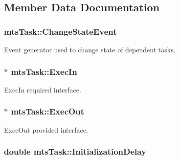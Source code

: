 \subsection{Member Data Documentation}
\hypertarget{classmts_task_ae7a10d8ab52bae5e6a5dc9589a7a386e}{
\subsubsection[{Change\-State\-Event}]{ mts\-Task\-::\-Change\-State\-Event\hspace{0.3cm}{\ttfamily [protected]}}}\label{classmts_task_ae7a10d8ab52bae5e6a5dc9589a7a386e}
Event generator used to change state of dependent tasks. \hypertarget{classmts_task_af77b19432b3640be7680c03cd0f78c22}{
\subsubsection[{Exec\-In}]{$\ast$ mts\-Task\-::\-Exec\-In\hspace{0.3cm}{\ttfamily [protected]}}}\label{classmts_task_af77b19432b3640be7680c03cd0f78c22}
Exec\-In required interface. \hypertarget{classmts_task_a5a65f2162a178087dc90effe7a9ab6d8}{
\subsubsection[{Exec\-Out}]{$\ast$ mts\-Task\-::\-Exec\-Out\hspace{0.3cm}{\ttfamily [protected]}}}\label{classmts_task_a5a65f2162a178087dc90effe7a9ab6d8}
Exec\-Out provided interface. \hypertarget{classmts_task_a019723804fb78a9c8a2146d921290570}{
\subsubsection[{Initialization\-Delay}]{\setlength{\rightskip}{0pt plus 5cm}double mts\-Task\-::\-Initialization\-Delay\hspace{0.3cm}{\ttfamily [protected]}}}\label{classmts_task_a019723804fb78a9c8a2146d921290570}
